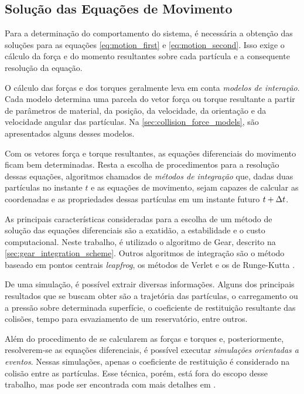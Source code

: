 \subsection{Solução das Equações de Movimento} \label{subsec:motion_equations_solution}

Para a determinação do comportamento do sistema, é necessária a obtenção das soluções para as equações \eqref{eq:motion_first} e \eqref{eq:motion_second}. Isso exige  o cálculo da força e do momento resultantes sobre cada partícula e a consequente resolução da equação. 

O cálculo das forças e dos torques geralmente leva em conta \textit{modelos de interação}. Cada modelo determina uma parcela do vetor força ou torque resultante a partir de parâmetros de material, da posição, da velocidade, da orientação e da velocidade angular das partículas. Na \autoref{sec:collision_force_models}, são apresentados alguns desses modelos. 
 
Com os vetores força e torque resultantes, as equações diferenciais do movimento ficam bem determinadas. Resta a escolha de procedimentos para a resolução dessas equações, algoritmos chamados de \textit{métodos de integração} que, dadas duas partículas no instante \(t\) e as equações de movimento, sejam capazes de calcular as coordenadas e as propriedades dessas partículas em um instante futuro \(t+\Delta t\).  
 
As principais características consideradas para a escolha de um método de solução das equações diferenciais são a exatidão, a estabilidade e o custo computacional. Neste trabalho, é utilizado o algoritmo de Gear, descrito na \autoref{sec:gear_integration_scheme}. Outros algoritmos de integração são o método baseado em pontos centrais \textit{leapfrog}, os métodos de Verlet e os de Runge-Kutta \cite{bib:sampaio}.
 
De uma simulação, é possível extrair diversas informações. Alguns dos principais resultados que se buscam obter são a trajetória das partículas, o carregamento ou a pressão sobre determinada superfície, o coeficiente de restituição resultante das colisões, tempo para esvaziamento de um reservatório, entre outros.

Além do procedimento de se calcularem as forças e torques e, posteriormente, resolverem-se as equações diferenciais, é possível executar \textit{simulações orientadas a eventos}. Nessas simulações, apenas o coeficiente de restituição é considerado na colisão entre as partículas. Esse técnica, porém, está fora do escopo desse trabalho, mas pode ser encontrada com mais detalhes em .

